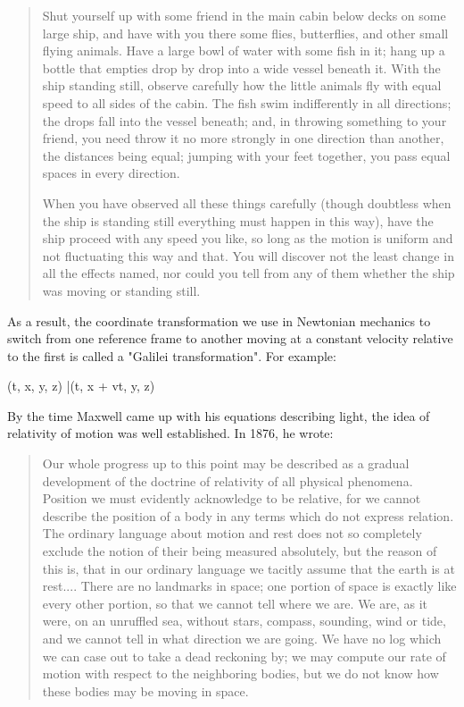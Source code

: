 \begin{quote}
  Shut yourself up with some friend in the main cabin below decks on
  some large ship, and have with you there some flies, butterflies,
  and other small flying animals. Have a large bowl of water with some
  fish in it; hang up a bottle that empties drop by drop into a wide
  vessel beneath it.  With the ship standing still, observe carefully how
  the little animals fly with equal speed to all sides of the cabin.  The
  fish swim indifferently in all directions; the drops fall into the
  vessel beneath; and, in throwing something to your friend, you need
  throw it no more strongly in one direction than another, the distances 
  being equal; jumping with your feet together, you pass equal spaces 
  in every direction.  

  When you have observed all these things carefully (though doubtless 
  when the ship is standing still everything must happen in this way), 
  have the ship proceed with any speed you like, so long as the motion 
  is uniform and not fluctuating this way and that.  You will discover 
  not the least change in all the effects named, nor could you tell 
  from any of them whether the ship was moving or standing still.
\end{quote}

As a result, the coordinate transformation we use in Newtonian
mechanics to switch from one reference frame to another moving at 
a constant velocity relative to the first is called a "Galilei
transformation".  For example:

(t, x, y, z) |\to  (t, x + vt, y, z)

By the time Maxwell came up with his equations describing light, 
the idea of relativity of motion was well established.  In 1876,
he wrote:

\begin{quote}
  Our whole progress up to this point may be described as a gradual
  development of the doctrine of relativity of all physical phenomena.
  Position we must evidently acknowledge to be relative, for we cannot
  describe the position of a body in any terms which do not express
  relation.  The ordinary language about motion and rest does not so
  completely exclude the notion of their being measured absolutely, but
  the reason of this is, that in our ordinary language we tacitly assume
  that the earth is at rest.... There are no landmarks in space; one
  portion of space is exactly like every other portion, so that we
  cannot tell where we are.  We are, as it were, on an unruffled sea,
  without stars, compass, sounding, wind or tide, and we cannot tell in
  what direction we are going.  We have no log which we can case out to
  take a dead reckoning by; we may compute our rate of motion with
  respect to the neighboring bodies, but we do not know how these bodies
  may be moving in space.  
\end{quote}

